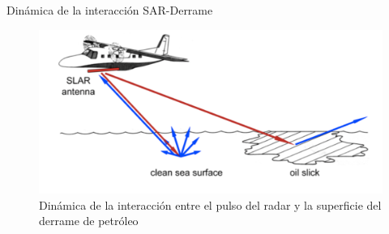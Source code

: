 \begin{frame}{Dinámica de la interacción SAR-Derrame}
    \begin{figure}
        \centering
        \includegraphics[scale=0.2]{img/section_03/sar-petroleo.png}
        \caption{Dinámica de la interacción entre el pulso del radar y la superficie del derrame de petróleo}
        \label{fig:section_03_dinamica_sar_petroleo}
    \end{figure}
\end{frame}
